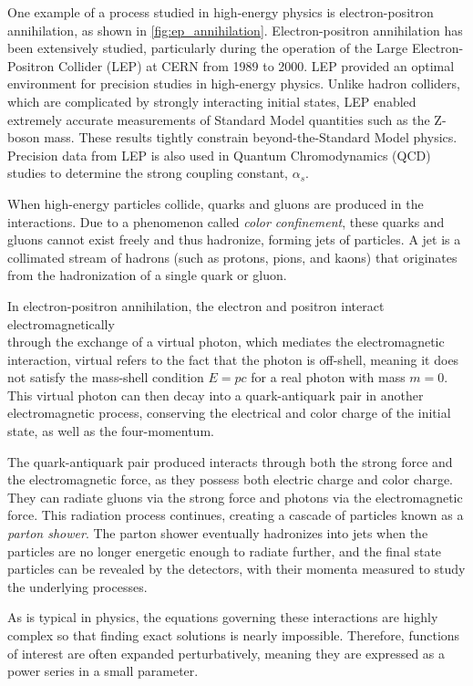 \documentclass[../Tesi_Jiahao_Miao_986136.tex]{subfiles}
\begin{document}
One example of a process studied in high-energy physics is electron-positron annihilation, as shown in \cref{fig:ep_annihilation}. 
Electron-positron annihilation has been extensively studied, particularly during the operation of the Large Electron-Positron Collider (LEP) at CERN from 1989 to 2000. 
LEP provided an optimal environment for precision studies in high-energy physics. 
Unlike hadron colliders, which are complicated by strongly interacting initial states, LEP enabled extremely accurate measurements of Standard Model quantities such as the Z-boson mass. 
These results tightly constrain beyond-the-Standard Model physics. Precision data from LEP is also used in Quantum Chromodynamics (QCD) studies to determine the strong coupling constant, $\alpha_s$.

When high-energy particles collide, quarks and gluons are produced in the interactions. Due to a phenomenon called \emph{color confinement}, 
these quarks and gluons cannot exist freely and thus hadronize, forming jets of particles. A jet is a collimated stream of hadrons (such as protons, pions, and kaons)
that originates from the hadronization of a single quark or gluon.

In electron-positron annihilation, the electron and positron interact electromagnetically \\
through the exchange of a virtual photon, which mediates the electromagnetic interaction, virtual refers 
to the fact that the photon is off-shell, meaning it does not satisfy the mass-shell condition $E = pc$ for a real photon with mass $m=0$. 
This virtual photon can then decay into a quark-antiquark pair in another electromagnetic process, conserving the electrical and color charge of the initial state, as well as the four-momentum.

The quark-antiquark pair produced interacts through both the strong force and the electromagnetic force, as they possess both electric charge and color charge.
They can radiate gluons via the strong force and photons via the electromagnetic force. This radiation process continues, creating a cascade of particles known as a \emph{parton shower}.
The parton shower eventually hadronizes into jets when the particles are no longer energetic enough to radiate further, and the final state particles can be revealed by the detectors, with their momenta measured to study the underlying processes.


As is typical in physics, the equations governing these interactions are highly complex so that finding exact solutions is nearly impossible.
Therefore, functions of interest are often expanded perturbatively, meaning they are expressed as a power series in a small parameter.
\end{document}
